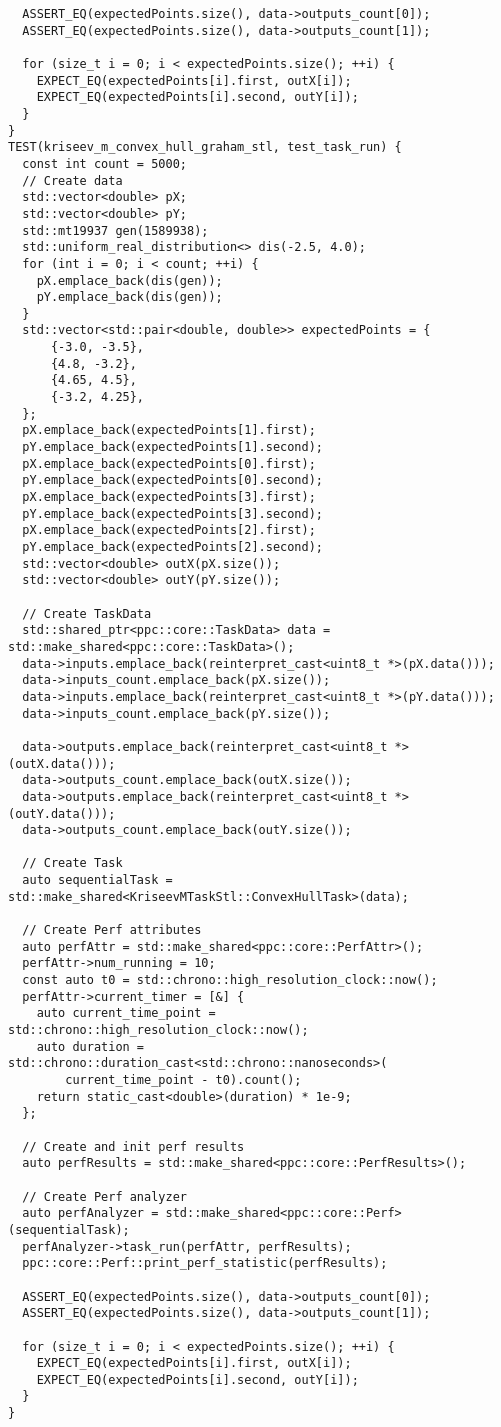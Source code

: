 \documentclass[a4paper,12pt]{article}
\begin{document}
\begin{lstlisting}
  ASSERT_EQ(expectedPoints.size(), data->outputs_count[0]);
  ASSERT_EQ(expectedPoints.size(), data->outputs_count[1]);

  for (size_t i = 0; i < expectedPoints.size(); ++i) {
    EXPECT_EQ(expectedPoints[i].first, outX[i]);
    EXPECT_EQ(expectedPoints[i].second, outY[i]);
  }
}
TEST(kriseev_m_convex_hull_graham_stl, test_task_run) {
  const int count = 5000;
  // Create data
  std::vector<double> pX;
  std::vector<double> pY;
  std::mt19937 gen(1589938);
  std::uniform_real_distribution<> dis(-2.5, 4.0);
  for (int i = 0; i < count; ++i) {
    pX.emplace_back(dis(gen));
    pY.emplace_back(dis(gen));
  }
  std::vector<std::pair<double, double>> expectedPoints = {
      {-3.0, -3.5},
      {4.8, -3.2},
      {4.65, 4.5},
      {-3.2, 4.25},
  };
  pX.emplace_back(expectedPoints[1].first);
  pY.emplace_back(expectedPoints[1].second);
  pX.emplace_back(expectedPoints[0].first);
  pY.emplace_back(expectedPoints[0].second);
  pX.emplace_back(expectedPoints[3].first);
  pY.emplace_back(expectedPoints[3].second);
  pX.emplace_back(expectedPoints[2].first);
  pY.emplace_back(expectedPoints[2].second);
  std::vector<double> outX(pX.size());
  std::vector<double> outY(pY.size());

  // Create TaskData
  std::shared_ptr<ppc::core::TaskData> data = std::make_shared<ppc::core::TaskData>();
  data->inputs.emplace_back(reinterpret_cast<uint8_t *>(pX.data()));
  data->inputs_count.emplace_back(pX.size());
  data->inputs.emplace_back(reinterpret_cast<uint8_t *>(pY.data()));
  data->inputs_count.emplace_back(pY.size());

  data->outputs.emplace_back(reinterpret_cast<uint8_t *>(outX.data()));
  data->outputs_count.emplace_back(outX.size());
  data->outputs.emplace_back(reinterpret_cast<uint8_t *>(outY.data()));
  data->outputs_count.emplace_back(outY.size());

  // Create Task
  auto sequentialTask = std::make_shared<KriseevMTaskStl::ConvexHullTask>(data);

  // Create Perf attributes
  auto perfAttr = std::make_shared<ppc::core::PerfAttr>();
  perfAttr->num_running = 10;
  const auto t0 = std::chrono::high_resolution_clock::now();
  perfAttr->current_timer = [&] {
    auto current_time_point = std::chrono::high_resolution_clock::now();
    auto duration = std::chrono::duration_cast<std::chrono::nanoseconds>(
        current_time_point - t0).count();
    return static_cast<double>(duration) * 1e-9;
  };

  // Create and init perf results
  auto perfResults = std::make_shared<ppc::core::PerfResults>();

  // Create Perf analyzer
  auto perfAnalyzer = std::make_shared<ppc::core::Perf>(sequentialTask);
  perfAnalyzer->task_run(perfAttr, perfResults);
  ppc::core::Perf::print_perf_statistic(perfResults);

  ASSERT_EQ(expectedPoints.size(), data->outputs_count[0]);
  ASSERT_EQ(expectedPoints.size(), data->outputs_count[1]);

  for (size_t i = 0; i < expectedPoints.size(); ++i) {
    EXPECT_EQ(expectedPoints[i].first, outX[i]);
    EXPECT_EQ(expectedPoints[i].second, outY[i]);
  }
}

\end{lstlisting}
\end{document}
